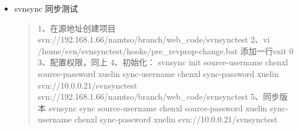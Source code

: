 \documentclass[a4paper,10pt,english]{sphinxmanual}
\begin{document}
\begin{itemize}
\item {} 
svnsync 同步测试
\begin{quote}

1、在源地址创建项目svn://192.168.1.66/namtso/branch/web\_code/svnsynctest
2、vi /home/svn/svnsynctest/hooks/pre\_revprop-change.bat
添加一行exit 0
3、配置权限，同上
4、初始化：
svnsync init  \textendash{}source-username chenxl \textendash{}source-password xuelin \textendash{}sync-username chenxl  \textendash{}sync-password xuelin svn://10.0.0.21/svnsynctest svn://192.168.1.66/namtso/branch/web\_code/svnsynctest
5、同步版本
svnsync sync \textendash{}source-username chenxl \textendash{}source-password xuelin \textendash{}sync-username chenxl  \textendash{}sync-password xuelin svn://10.0.0.21/svnsynctest
\end{quote}

\end{itemize}



\renewcommand{\indexname}{Index}
\printindex
\end{document}
